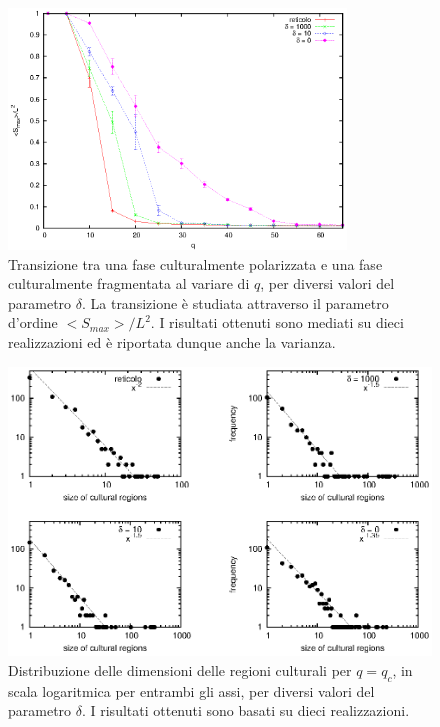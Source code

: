 \documentclass[a4paper,12pt]{article}
\begin{document}
\begin{figure}[!ht]
\begin{center}
\includegraphics[width=0.8\textwidth]{transizione.eps}
\end{center}
\caption{Transizione tra una fase culturalmente polarizzata e una fase culturalmente fragmentata al variare di $q$, per diversi valori del parametro $\delta$. La transizione \`{e} studiata attraverso il parametro d'ordine $<S_{max}>/L^2$. I risultati ottenuti sono mediati su dieci realizzazioni ed \`{e} riportata dunque anche la varianza.}
\label{transiz}
\end{figure}

\begin{figure}[!ht]
\begin{center}
\includegraphics[width=\textwidth]{cum_distr_size_qCritico.eps}
\end{center}
\caption{Distribuzione delle dimensioni delle regioni culturali per $q = q_c$, in scala logaritmica per entrambi gli assi, per diversi valori del parametro $\delta$. I risultati ottenuti sono basati su dieci realizzazioni.}
\label{cum_distr_size}
\end{figure}
\end{document}
